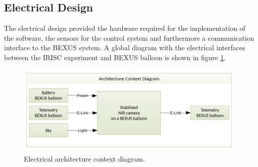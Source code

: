 \pagebreak
\subsection{Electrical Design}
The electrical design provided the hardware required for the implementation of the software, the sensors for the control system and furthermore a communication interface to the BEXUS system. A global diagram with the electrical interfaces between the IRISC experiment and BEXUS balloon is shown in figure \ref{fig:elec-ACD}. %
\vspace{-.5cm}
\begin{figure}[H]
	\centering
	\includegraphics[width=.6\textwidth]{4-experiment-design/img/electrical/ArchitectureContext.png}
	\caption{Electrical architecture context diagram.}
	\label{fig:elec-ACD}
\end{figure}



